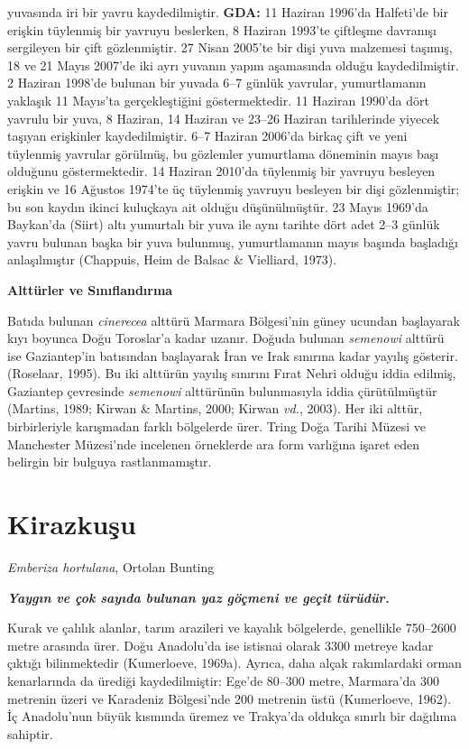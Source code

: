 \documentclass[
  10.5pt,
  a4paper,
  DIV=11,
  numbers=noendperiod,
  twocolumn]{scrreprt}
\begin{document}
yuvasında iri bir yavru kaydedilmiştir. \textbf{GDA:} 11 Haziran 1996'da
Halfeti'de bir erişkin tüylenmiş bir yavruyu beslerken, 8 Haziran
1993'te çiftleşme davranışı sergileyen bir çift gözlenmiştir. 27 Nisan
2005'te bir dişi yuva malzemesi taşımış, 18 ve 21 Mayıs 2007'de iki ayrı
yuvanın yapım aşamasında olduğu kaydedilmiştir. 2 Haziran 1998'de
bulunan bir yuvada 6--7 günlük yavrular, yumurtlamanın yaklaşık 11
Mayıs'ta gerçekleştiğini göstermektedir. 11 Haziran 1990'da dört yavrulu
bir yuva, 8 Haziran, 14 Haziran ve 23--26 Haziran tarihlerinde yiyecek
taşıyan erişkinler kaydedilmiştir. 6--7 Haziran 2006'da birkaç çift ve
yeni tüylenmiş yavrular görülmüş, bu gözlemler yumurtlama döneminin
mayıs başı olduğunu göstermektedir. 14 Haziran 2010'da tüylenmiş bir
yavruyu besleyen erişkin ve 16 Ağustos 1974'te üç tüylenmiş yavruyu
besleyen bir dişi gözlenmiştir; bu son kaydın ikinci kuluçkaya ait
olduğu düşünülmüştür. 23 Mayıs 1969'da Baykan'da (Siirt) altı yumurtalı
bir yuva ile aynı tarihte dört adet 2--3 günlük yavru bulunan başka bir
yuva bulunmuş, yumurtlamanın mayıs başında başladığı anlaşılmıştır
(Chappuis, Heim de Balsac \& Vielliard, 1973).

\textbf{Alttürler ve Sınıflandırma}

Batıda bulunan \emph{cinerecea} alttürü Marmara Bölgesi'nin güney
ucundan başlayarak kıyı boyunca Doğu Toroslar'a kadar uzanır. Doğuda
bulunan \emph{semenowi} alttürü ise Gaziantep'in batısından başlayarak
İran ve Irak sınırına kadar yayılış gösterir. (Roselaar, 1995). Bu iki
alttürün yayılış sınırını Fırat Nehri olduğu iddia edilmiş, Gaziantep
çevresinde \emph{semenowi} alttürünün bulunmasıyla iddia çürütülmüştür
(Martins, 1989; Kirwan \& Martins, 2000; Kirwan \emph{vd.}, 2003). Her
iki alttür, birbirleriyle karışmadan farklı bölgelerde ürer. Tring Doğa
Tarihi Müzesi ve Manchester Müzesi'nde incelenen örneklerde ara form
varlığına işaret eden belirgin bir bulguya rastlanmamıştır.

\section{Kirazkuşu}\label{kirazkuux15fu}

\emph{Emberiza hortulana}, Ortolan Bunting

\textbf{\emph{Yaygın ve çok sayıda bulunan yaz göçmeni ve geçit
türüdür.}}

Kurak ve çalılık alanlar, tarım arazileri ve kayalık bölgelerde,
genellikle 750--2600 metre arasında ürer. Doğu Anadolu'da ise istisnai
olarak 3300 metreye kadar çıktığı bilinmektedir (Kumerloeve, 1969a).
Ayrıca, daha alçak rakımlardaki orman kenarlarında da ürediği
kaydedilmiştir: Ege'de 80--300 metre, Marmara'da 300 metrenin üzeri ve
Karadeniz Bölgesi'nde 200 metrenin üstü (Kumerloeve, 1962). İç
Anadolu'nun büyük kısmında üremez ve Trakya'da oldukça sınırlı bir
dağılıma sahiptir.
\end{document}
